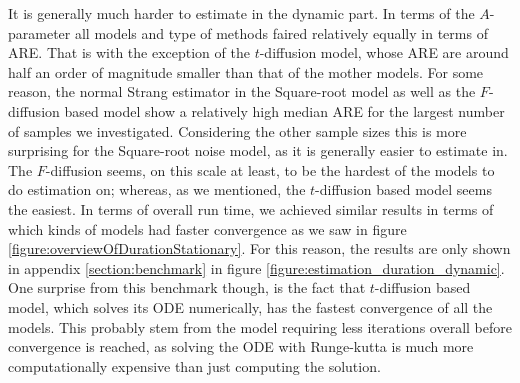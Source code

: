 It is generally much harder to estimate in the dynamic part. In terms of the $A$-parameter all models and type of methods faired relatively equally in terms of ARE. That is with the exception of the $t$-diffusion model, whose ARE are around half an order of magnitude smaller than that of the mother models. For some reason, the normal Strang estimator in the Square-root model as well as the $F$-diffusion based model show a relatively high median ARE for the largest number of samples we investigated.  Considering the other sample sizes this is more surprising for the Square-root noise model, as it is generally easier to estimate in. The $F$-diffusion seems, on this scale at least, to be the hardest of the models to do estimation on; whereas, as we mentioned, the $t$-diffusion based model seems the easiest. In terms of overall run time, we achieved similar results in terms of which kinds of models had faster convergence as we saw in figure \ref{figure:overviewOfDurationStationary}. For this reason, the results are only shown in appendix \ref{section:benchmark} in figure \ref{figure:estimation_duration_dynamic}. One surprise from this benchmark though, is the fact that $t$-diffusion based model, which solves its ODE numerically, has the fastest convergence of all the models. This probably stem from the model requiring less iterations overall before convergence is reached, as solving the ODE with Runge-kutta is much more computationally expensive than just computing the solution.

